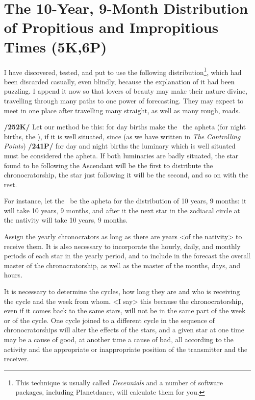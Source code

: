 \section{The 10-Year, 9-Month Distribution of Propitious and Impropitious Times (5K,6P)}

I have discovered, tested, and put to use the following distribution\footnote{This technique is usually called \textsl{Decennials} and a number of software packages, including Planetdance, will calculate them for you.}, which had been discarded casually, even blindly, because the explanation of it had been puzzling. I append it now so that lovers of beauty may make their nature divine, travelling through many paths to one power of forecasting. They may expect to meet in one place after travelling many straight, as well as many rough, roads.

\textbf{/252K/} Let our method be this: for day births make the \Sun\, the apheta (for night births, the \Moon), if it is well situated, since (as we have written in \textit{The Controlling Points}) \textbf{/241P/} for day and night births the luminary which is well situated must be considered the apheta. If both luminaries are badly situated, the star found to be following the Ascendant will be the first to distribute the chronocratorship, the star just following it will be the second, and so on with the rest.

For instance, let the \Sun\, be the apheta for the distribution of 10 years, 9 months: it will take 10 years, 9 months, and after it the next star in the zodiacal circle at the nativity will take 10 years, 9 months.

Assign the yearly chronocrators as long as there are years <of the nativity> to receive them. It is also necessary to incorporate the hourly, daily, and monthly periods of each star in the yearly period, and to include in the forecast the overall master of the chronocratorship, as well as the master of the months, days, and hours. 

It is necessary to determine the cycles, how long they are and who is receiving the cycle and the week from whom. <I say> this because the chronocratorship, even if it comes back to the same stars,
will not be in the same part of the week or of the cycle. One cycle joined to a different cycle in the sequence of chronocratorships will alter the effects of the stars, and a given star at one time may be a cause of good, at another time a cause of bad, all according to the activity and the appropriate or inappropriate position of the transmitter and the receiver.


